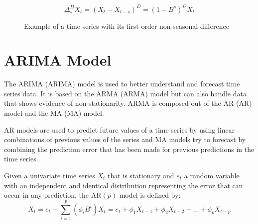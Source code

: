 \begin{equation}\label{eq:seasonal_difference}
\Delta_s^D X_t = (X_t - X_{t-s})^D = (1-B^s)^DX_t
\end{equation}

\begin{figure}[ht]
	\centering
	\caption{Example of a time series with its first order non-seasonal difference}
	\label{fig:example_seasonal_diff}
\end{figure}



\section{ARIMA Model}\label{arimamodel}
The \acl{ARIMA} (\acs{ARIMA}) model is used to better understand and forecast time series data. It is based on the \acl{ARMA} (\acs{ARMA}) model but can also handle data that shows evidence of non-stationarity.  
\acs{ARMA} is composed out of the \acl{AR} (\acs{AR}) model and the \acl{MA} (\acs{MA}) model.

\acl{AR} models are used to predict future values of a time series by using linear combinations of previous values of the series and \acl{MA} models try to forecast by combining the prediction error that has been made for previous predictions in the time series.

Given a univariate time series \(X_t\) that is stationary and \(e_t\) a random variable with an independent and identical distribution representing the error that can occur in any prediction, the \acs{AR}\((p)\) model is defined by:
\begin{equation}\label{eq:AR_p}
X_t = e_t + \displaystyle\sum_{i=1}^{p} (\phi_i B^i) X_t = e_t + \phi_1 X_{t-1}+ \phi_2 X_{t-2}+ ... + \phi_p X_{t-p}
\end{equation}

